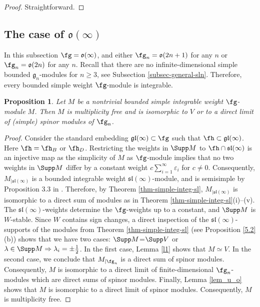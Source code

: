 \documentclass[12pt]{amsart}
\def\gg{\mathfrak{g}}
\def\go{\mathfrak{o}}
\newtheorem{prop}[thm]{Proposition}
\begin{document}
\begin{proof}
Straightforward.
\end{proof}





\subsection{The case of $\mathfrak{o} (\infty)$} In this subsection $\fg=\go(\infty)$, and either $\fg_n=\mathfrak{o}(2n+1)$ for any $n$ or  $\fg_n= \mathfrak{o}(2n)$ for any $n$.
Recall that there are no infinite-dimensional simple bounded $\gg_n$-modules for $n\geq 3$, see Subsection \ref{subsec-general-sln}. Therefore, every bounded  simple weight $\fg$-module is integrable. 

\begin{prop}\label{asd} Let $M$ be a nontrivial bounded simple integrable weight $\fg$-module $M$. Then $M$ is  multiplicity free and is  isomorphic to $V$ or to a direct limit of (simple) spinor modules of $\fg_n$.
\end{prop}

\begin{proof} Consider the standard embedding $\mathfrak{gl}(\infty)\subset\fg$ such that $\fh\subset\mathfrak{gl}(\infty)$. Here $\fh=\fh_B$ or $\fh_D$. Restricting the weights in $\Supp M$ to $\fh\cap\mathfrak{sl}(\infty)$ is an injective map as the simplicity of $M$ as $\fg$-module implies that no two weights in $\Supp M$ differ by a constant weight $c\sum^\infty_{i=1}\varepsilon_i$ for $c\neq 0$. Consequently, $M_{|\mathfrak{sl}(\infty)}$ is a bounded integrable  weight $\mathfrak{sl}(\infty)$-module, and is  semisimple by Proposition 3.3 in \cite{PS}. Therefore, by Theorem \ref{thm-simple-integ-sl}, $M_{|\mathfrak{sl}(\infty)}$ is isomorphic to a direct sum of modules as in Theorem \ref{thm-simple-integ-sl}(i)--(v). The $\mathfrak{sl}(\infty)$-weights determine the $\fg$-weights up to a constant, and $\Supp M$ is $W$-stable. Since $W$ contains sign changes, a direct inspection of the $\mathfrak{sl}(\infty)$-supports of the modules from Theorem \ref{thm-simple-integ-sl} (see Proposition \ref{5.2}(b)) shows that we have two cases: $\Supp M$=$\Supp V$ or $\lambda\in \Supp M\Rightarrow \lambda_i=\pm \frac{1}{2}$. In the first case, Lemma \ref{l1} shows that $M\simeq V$. In the second case, we conclude that $M_{|\fg_n}$ is a direct sum of spinor modules. Consequently, $M$ is isomorphic to a direct limit of finite-dimensional $\fg_n$-modules which are  direct sums of spinor modules. Finally, Lemma \ref{lem_u_o} shows that $M$ is isomorphic to a direct limit of  spinor modules. Consequently, $M$ is  multiplicity free.
\end{proof} 
\end{document}
